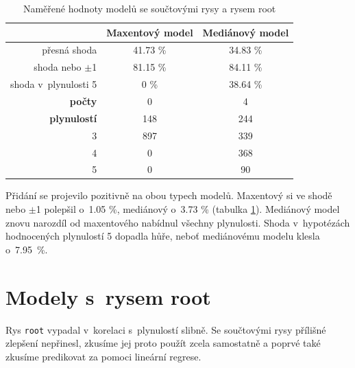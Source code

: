 \documentclass[12pt,a4paper]{report}
\begin{document}
\begin{table}[!htbp]
\begin{center}
\begin{tabular}{|r|c|c|}
\hline
 & \textbf{Maxentový model} & \textbf{Mediánový model}\\
 \hline
přesná shoda & 41.73 \%  & 34.83 \%  \\
\hline
shoda nebo $\pm$1 & 81.15 \% & 84.11 \%  \\
\hline
shoda v~plynulosti 5 & \color{red}0 \% & 38.64 \%  \\
\hline
     \textbf{počty} \quad 1 & \color{red}0   & 4   \\
\textbf{plynulostí} \quad 2 & 148 & 244   \\
                          3 & 897 & 339 \\
                          4 & \color{red}0   & 368 \\
                          5 & \color{red}0   & 90  \\
\hline
\end{tabular}
\caption{Naměřené hodnoty modelů se součtovými rysy a rysem root}\label{tb:allsumsroot}
\end{center}
\end{table}

Přidání se projevilo pozitivně na obou typech modelů. Maxentový si ve shodě nebo $\pm$1 polepšil o~1.05 \%, mediánový o~3.73 \% (tabulka \ref{tb:allsumsroot}). Mediánový model znovu narozdíl od maxentového nabídnul všechny plynulosti. Shoda v~hypotézách hodnocených plynulostí 5 dopadla hůře, neboť mediánovému modelu klesla o~7.95~\%.


\section{Modely s~rysem root}
Rys \texttt{root} vypadal v~korelaci s~plynulostí slibně. Se součtovými rysy přílišné zlepšení nepřinesl, zkusíme jej proto použít zcela samostatně a poprvé také zkusíme predikovat za pomoci lineární regrese.
\end{document}

